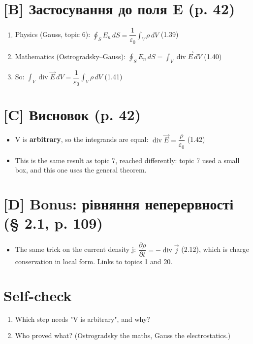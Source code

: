 \documentclass[11pt,a4paper,oneside]{book}
\begin{document}
\section*{[B] Застосування до поля E (p. 42)}
\begin{enumerate}
\item Physics (Gauss, topic 6): $\oint_S E_n\,dS = \dfrac1{\varepsilon_0}\int_V\rho\,dV$ (1.39)
\item Mathematics (Ostrogradsky–Gauss): $\oint_S E_n\,dS = \int_V\operatorname{div}\vec E\,dV$ (1.40)
\item So: $\int_V\operatorname{div}\vec E\,dV = \dfrac1{\varepsilon_0}\int_V\rho\,dV$ (1.41)
\end{enumerate}

\section*{[C] Висновок (p. 42)}
\begin{itemize}
\item V is \textbf{arbitrary}, so the integrands are equal: $\operatorname{div}\vec E = \dfrac{\rho}{\varepsilon_0}$ (1.42)
\item This is the same result as topic 7, reached differently: topic 7 used a small box, and this one uses the general theorem.
\end{itemize}

\section*{[D] Bonus: рівняння неперервності (§ 2.1, p. 109)}
\begin{itemize}
\item The same trick on the current density j: $\dfrac{\partial\rho}{\partial t} = -\operatorname{div}\vec j$ (2.12), which is charge conservation in local form. Links to topics 1 and 20.
\end{itemize}

\section*{Self-check}
\begin{enumerate}
\item Which step needs "V is arbitrary", and why?
\item Who proved what? (Ostrogradsky the maths, Gauss the electrostatics.)
\end{enumerate}
\end{document}

